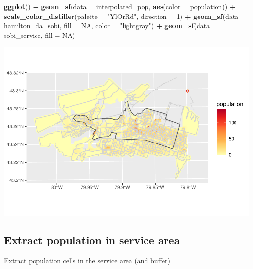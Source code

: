 \documentclass[
]{article}
\newenvironment{Shaded}{\begin{snugshade}}{\end{snugshade}}
\newcommand{\DataTypeTok}[1]{\textcolor[rgb]{0.13,0.29,0.53}{#1}}
\newcommand{\DecValTok}[1]{\textcolor[rgb]{0.00,0.00,0.81}{#1}}
\newcommand{\KeywordTok}[1]{\textcolor[rgb]{0.13,0.29,0.53}{\textbf{#1}}}
\newcommand{\NormalTok}[1]{#1}
\newcommand{\OperatorTok}[1]{\textcolor[rgb]{0.81,0.36,0.00}{\textbf{#1}}}
\newcommand{\OtherTok}[1]{\textcolor[rgb]{0.56,0.35,0.01}{#1}}
\newcommand{\StringTok}[1]{\textcolor[rgb]{0.31,0.60,0.02}{#1}}
\begin{document}
\begin{Shaded}
\begin{Highlighting}[]
\KeywordTok{ggplot}\NormalTok{() }\OperatorTok{+}\StringTok{ }
\StringTok{  }\KeywordTok{geom_sf}\NormalTok{(}\DataTypeTok{data =}\NormalTok{ interpolated_pop,}
          \KeywordTok{aes}\NormalTok{(}\DataTypeTok{color =}\NormalTok{ population)) }\OperatorTok{+}
\StringTok{  }\KeywordTok{scale_color_distiller}\NormalTok{(}\DataTypeTok{palette =} \StringTok{"YlOrRd"}\NormalTok{, }
                        \DataTypeTok{direction =} \DecValTok{1}\NormalTok{) }\OperatorTok{+}
\StringTok{  }\KeywordTok{geom_sf}\NormalTok{(}\DataTypeTok{data =}\NormalTok{ hamilton_da_sobi,}
          \DataTypeTok{fill =} \OtherTok{NA}\NormalTok{,}
          \DataTypeTok{color =} \StringTok{"lightgray"}\NormalTok{) }\OperatorTok{+}\StringTok{ }
\StringTok{  }\KeywordTok{geom_sf}\NormalTok{(}\DataTypeTok{data =}\NormalTok{ sobi_service,}
          \DataTypeTok{fill =} \OtherTok{NA}\NormalTok{)}
\end{Highlighting}
\end{Shaded}

\includegraphics{00-Data-Processing-Example_files/figure-latex/unnamed-chunk-80-1.pdf}

\hypertarget{extract-population-in-service-area}{%
\subsection{Extract population in service
area}\label{extract-population-in-service-area}}

Extract population cells in the service area (and buffer)

\begin{Shaded}
\end{Shaded}
\end{document}
